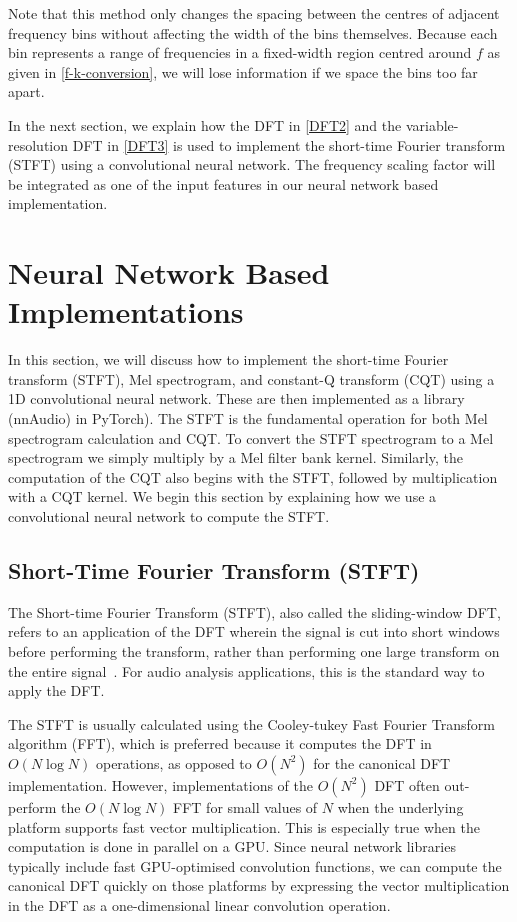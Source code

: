 \documentclass{ieeeaccess}
\begin{document}
Note that this method only changes the spacing between the centres of adjacent frequency bins without affecting the width of the bins themselves. Because each bin represents a range of frequencies in a fixed-width region centred around $f$ as given in \eqref{f-k-conversion}, we will lose information if we space the bins too far apart.  


In the next section, we explain how the DFT in \eqref{DFT2} and the variable-resolution DFT in \eqref{DFT3} is used to implement the short-time Fourier transform (STFT) using a convolutional neural network. The frequency scaling factor will be integrated as one of the input features in our neural network based implementation.



\section{Neural Network Based Implementations} \label{sec: PyTorch}
In this section, we will discuss how to implement the short-time Fourier transform (STFT), Mel spectrogram, and constant-Q transform (CQT) using a 1D convolutional neural network. These are then  implemented as a library (nnAudio) in PyTorch\footnotemark[\ref{nnAudio}]). The STFT is the fundamental operation for both Mel spectrogram calculation and CQT. To convert the STFT spectrogram to a Mel spectrogram we simply multiply by a Mel filter bank kernel. Similarly, the computation of the CQT also begins with the STFT, followed by multiplication with a CQT kernel. We begin this section by explaining how we use a convolutional neural network to compute the STFT.


\subsection{Short-Time Fourier Transform (STFT)} \label{subsec:STFT}
The Short-time Fourier Transform (STFT), also called the sliding-window DFT, refers to an application of the DFT wherein the signal is cut into short windows before performing the transform, rather than performing one large transform on the entire signal~\cite{Nawab:1987:SFT:42739.42745}. For audio analysis applications, this is the standard way to apply the DFT.


The STFT is usually calculated using the Cooley-tukey Fast Fourier Transform algorithm (FFT), which is preferred because it computes the DFT in $O(N \log N)$ operations, as opposed to $O(N^2)$ for the canonical DFT implementation. However, implementations of the $O(N^2)$ DFT often out-perform the $O(N \log N)$ FFT for small values of $N$ when the underlying platform supports fast vector multiplication. This is especially true when the computation is done in parallel on a GPU. Since neural network libraries typically include fast GPU-optimised convolution functions, we can compute the canonical DFT quickly on those platforms by expressing the vector multiplication in the DFT as a one-dimensional linear convolution operation. 
\end{document}
